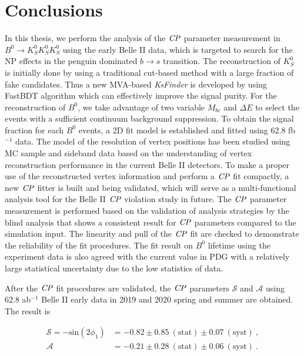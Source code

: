 \section{Conclusions}
In this thesis, we perform the analysis of the $\it{CP}$ parameter measurement in $B^0 \to K_S^0  K_S^0  K_S^0$ using the early Belle II data, which is targeted to search for the NP effects in the penguin dominated $b\to s$ transition. The reconstruction of $K_S^0$ is initially done by using a traditional cut-based method with a large fraction of fake candidates. Thus a new MVA-based \textit{KsFinder} is developed by using FastBDT algorithm  which can effectively improve the signal purity. For the reconstruction of $B^0$, we take advantage of two variable $M_{bc}$ and $\Delta E$ to select the events with a sufficient continuum background suppression. To obtain the signal fraction for each $B^0$ events, a 2D fit model is established and fitted using 62.8 fb$^{-1}$ data. 
The model of the resolution of vertex positions has been studied using MC sample and sideband data based on the understanding of vertex reconstruction performance in the current Belle II detectors. To make a proper use of the reconstructed vertex information and perform a $\it{CP}$ fit compactly, a new $\it{CP}$ fitter is built and being validated, which will serve as a multi-functional analysis tool for the Belle II $\it{CP}$ violation study in future. 
The $\it{CP}$ parameter measurement is performed based on the validation of analysis strategies by the blind analysis that shows a consistent result for $\it{CP}$ parameters compared to the simulation input. The linearity and pull of the $\it{CP}$ fit are checked to demonstrate the reliability of the fit procedures. The fit result on $B^0$ lifetime using the experiment data is also agreed with the current value in PDG with a relatively large statistical uncertainty due to the low statistics of data.

After the $\it{CP}$ fit procedures are validated, the $\it{CP}$ parameters $\mathcal{S}$ and $\mathcal{A}$ using 62.8 ab$^{-1}$ Belle II early data in 2019 and 2020 spring and summer are obtained. The result is

\begin{equation}\label{eq:data_fit_cp}
\begin{split}
\mathcal{S}=- \text{sin}(2\phi_1) & = -0.82 \pm 0.85~(\text{stat}) \pm 0.07~(\text{syst})~, \\
\mathcal{A} & = -0.21\pm 0.28~(\text{stat}) \pm 0.06~(\text{syst})~.\\
\end{split}
\end{equation}  

